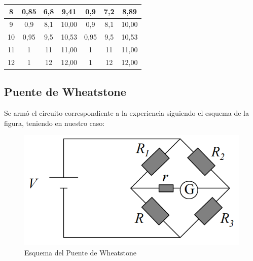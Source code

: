 \documentclass{article}
\begin{document}
\begin{table}[H]
\begin{adjustbox}{max width= \columnwidth}
\begin{tabular}{|c|c|c|c|c|c|c|}
8                                                       & 0,85          & 6,8     & 9,41                    & 0,9                                                                       & 7,2     & 8,89                    \\ \hline
9                                                       & 0,9           & 8,1     & 10,00                   & 0,9                                                                       & 8,1     & 10,00                   \\ \hline
10                                                      & 0,95          & 9,5     & 10,53                   & 0,95                                                                      & 9,5     & 10,53                   \\ \hline
11                                                      & 1             & 11      & 11,00                   & 1                                                                         & 11      & 11,00                   \\ \hline
12                                                      & 1             & 12      & 12,00                   & 1                                                                         & 12      & 12,00                   \\ \hline
\end{tabular}
\end{adjustbox}
\end{table}


\subsection{Puente de Wheatstone }

Se armó el circuito correspondiente a la experiencia siguiendo el esquema de la figura, teniendo en nuestro caso:

\begin{figure}[ht]
\centering
\includegraphics[scale=0.5]{puente_wheatstone}
\caption{Esquema del Puente de Wheatstone}
\end{figure}
\end{document}
